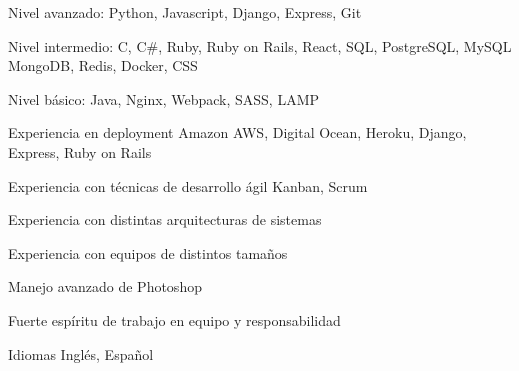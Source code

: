 

\begin{cvskills}

  \cvskill
    {Nivel avanzado:}
    {Python, Javascript, Django, Express, Git}

  \cvskill
    {Nivel intermedio:}
    {C, C\#, Ruby, Ruby on Rails, React, SQL, PostgreSQL, MySQL}
  \cvskill
    {}
    {MongoDB, Redis, Docker, CSS}

  \cvskill
    {Nivel básico:}
    {Java, Nginx, Webpack, SASS, LAMP}

  \cvskill
    {Experiencia en deployment}
    {Amazon AWS, Digital Ocean, Heroku, Django, Express, Ruby on Rails}

  \cvskill
    {Experiencia con técnicas de desarrollo ágil}
    {Kanban, Scrum}

  \cvskill
    {Experiencia con distintas arquitecturas de sistemas}
    {}

  \cvskill
    {Experiencia con equipos de distintos tamaños}
    {}

  \cvskill
    {Manejo avanzado de Photoshop}
    {}

  \cvskill
    {Fuerte espíritu de trabajo en equipo y responsabilidad}
    {}

  \cvskill
    {Idiomas}
    {Inglés, Español}

\end{cvskills}
